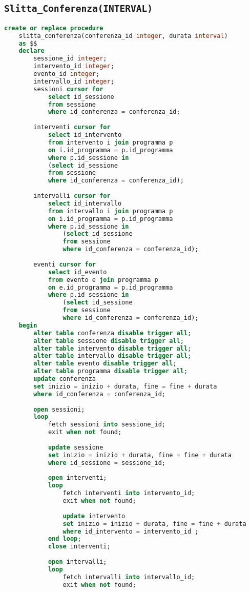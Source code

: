 \subsection{\texttt{Slitta\_Conferenza(INTERVAL)}}
\begin{lstlisting}[language=SQL,style=mystyle]
create or replace procedure 
	slitta_conferenza(conferenza_id integer, durata interval)
	as $$
	declare
		sessione_id integer;
		intervento_id integer;
		evento_id integer;
		intervallo_id integer;
		sessioni cursor for 
			select id_sessione 
			from sessione 
			where id_conferenza = conferenza_id;
			
		interventi cursor for
			select id_intervento 
			from intervento i join programma p 
			on i.id_programma = p.id_programma 
			where p.id_sessione in 
			(select id_sessione 
			from sessione 
			where id_conferenza = conferenza_id);
			
		intervalli cursor for
			select id_intervallo 
			from intervallo i join programma p 
			on i.id_programma = p.id_programma 
			where p.id_sessione in 
				(select id_sessione 
				from sessione 
				where id_conferenza = conferenza_id);
				
		eventi cursor for
			select id_evento 
			from evento e join programma p 
			on e.id_programma = p.id_programma 
			where p.id_sessione in 
				(select id_sessione 
				from sessione 
				where id_conferenza = conferenza_id);
	begin
        alter table conferenza disable trigger all;
        alter table sessione disable trigger all;
        alter table intervento disable trigger all;
        alter table intervallo disable trigger all;
        alter table evento disable trigger all;
        alter table programma disable trigger all;
		update conferenza
		set inizio = inizio + durata, fine = fine + durata
		where id_conferenza = conferenza_id;
	
		open sessioni;
		loop
			fetch sessioni into sessione_id;
			exit when not found;
			
			update sessione
			set inizio = inizio + durata, fine = fine + durata
			where id_sessione = sessione_id;
		
			open interventi;
			loop
				fetch interventi into intervento_id;
				exit when not found;
	
				update intervento
				set inizio = inizio + durata, fine = fine + durata
				where id_intervento = intervento_id ;
			end loop;
			close interventi;
			
			open intervalli;
			loop
				fetch intervalli into intervallo_id;
				exit when not found;
	

\end{lstlisting}

